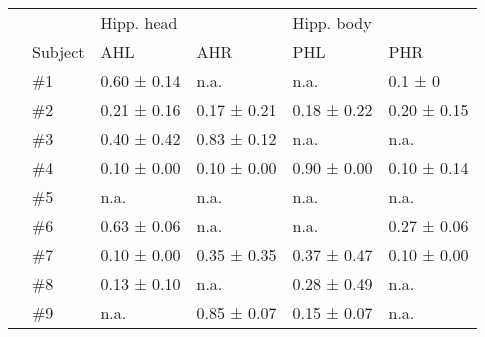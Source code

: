 \documentclass[a4paper]{article}
\begin{document}
\begin{tabular}{|l|l|l|l|l|l|}
\hline
&&&&&\\
\hline
&&Hipp. head&&Hipp. body&\\
\hline
&Subject&AHL&AHR&PHL&PHR\\
\hline
&\#1&0.60 ± 0.14&n.a.&n.a.&0.1 ± 0\\
\hline
&\#2&0.21 ± 0.16&0.17 ± 0.21&0.18 ± 0.22&0.20 ± 0.15\\
\hline
&\#3&0.40 ± 0.42&0.83 ± 0.12&n.a.&n.a.\\
\hline
&\#4&0.10 ± 0.00&0.10 ± 0.00&0.90 ± 0.00&0.10 ± 0.14\\
\hline
&\#5&n.a.&n.a.&n.a.&n.a.\\
\hline
&\#6&0.63 ± 0.06&n.a.&n.a.&0.27 ± 0.06\\
\hline
&\#7&0.10 ± 0.00&0.35 ± 0.35&0.37 ± 0.47&0.10 ± 0.00\\
\hline
&\#8&0.13 ± 0.10&n.a.&0.28 ± 0.49&n.a.\\
\hline
&\#9&n.a.&0.85 ± 0.07&0.15 ± 0.07&n.a.\\
\hline
\end{tabular}
\end{document}
